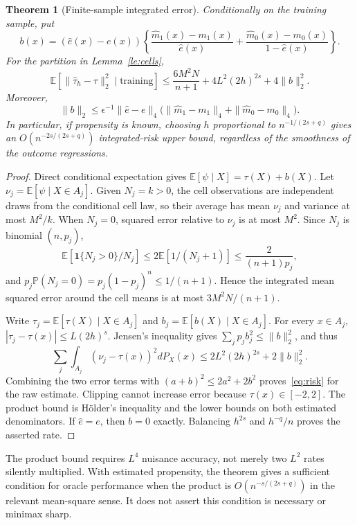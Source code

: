 \documentclass[11pt,a4paper]{article}
\newtheorem{theorem}{Theorem}[section]
\theoremstyle{definition}
\theoremstyle{remark}
\newcommand{\E}{\mathbb E}
\newcommand{\Prb}{\mathbb P}
\newcommand{\ind}{\mathbf 1}
\begin{document}
\begin{theorem}[Finite-sample integrated error]\label{th:risk}
Conditionally on the training sample, put
\[
 b(x)=(\widehat e(x)-e(x))\left\{
 \frac{\widehat m_1(x)-m_1(x)}{\widehat e(x)}+
 \frac{\widehat m_0(x)-m_0(x)}{1-\widehat e(x)}\right\}.
\]
For the partition in Lemma~\ref{le:cells},
\begin{equation}\label{eq:risk}
 \E[\|\widehat\tau_h-\tau\|_2^2\mid\text{training}]
 \leq\frac{6M^2N}{n+1}+4L^2(2h)^{2s}+4\|b\|_2^2.
\end{equation}
Moreover,
\[
 \|b\|_2\leq\epsilon^{-1}\|\widehat e-e\|_4
  \bigl(\|\widehat m_1-m_1\|_4+\|\widehat m_0-m_0\|_4\bigr).
\]
In particular, if propensity is known, choosing $h$ proportional to $n^{-1/(2s+q)}$ gives an $O(n^{-2s/(2s+q)})$ integrated-risk upper bound, regardless of the smoothness of the outcome regressions.
\end{theorem}
\begin{proof}
Direct conditional expectation gives $\E[\psi\mid X]=\tau(X)+b(X)$. Let $\nu_j=\E[\psi\mid X\in A_j]$. Given $N_j=k>0$, the cell observations are independent draws from the conditional cell law, so their average has mean $\nu_j$ and variance at most $M^2/k$. When $N_j=0$, squared error relative to $\nu_j$ is at most $M^2$. Since $N_j$ is binomial $(n,p_j)$,
\[
 \E[\ind\{N_j>0\}/N_j]\leq2\E[1/(N_j+1)]
 \leq\frac{2}{(n+1)p_j},
\]
and $p_j\Prb(N_j=0)=p_j(1-p_j)^n\leq1/(n+1)$. Hence the integrated mean squared error around the cell means is at most $3M^2N/(n+1)$.

Write $\tau_j=\E[\tau(X)\mid X\in A_j]$ and $b_j=\E[b(X)\mid X\in A_j]$. For every $x\in A_j$, $|\tau_j-\tau(x)|\leq L(2h)^s$. Jensen's inequality gives $\sum_jp_jb_j^2\leq\|b\|_2^2$, and thus
\[
 \sum_j\int_{A_j}(\nu_j-\tau(x))^2dP_X(x)
 \leq2L^2(2h)^{2s}+2\|b\|_2^2.
\]
Combining the two error terms with $(a+b)^2\leq2a^2+2b^2$ proves~\eqref{eq:risk} for the raw estimate. Clipping cannot increase error because $\tau(x)\in[-2,2]$. The product bound is H\"older's inequality and the lower bounds on both estimated denominators. If $\widehat e=e$, then $b=0$ exactly. Balancing $h^{2s}$ and $h^{-q}/n$ proves the asserted rate.
\end{proof}

The product bound requires $L^4$ nuisance accuracy, not merely two $L^2$ rates silently multiplied. With estimated propensity, the theorem gives a sufficient condition for oracle performance when the product is $O(n^{-s/(2s+q)})$ in the relevant mean-square sense. It does not assert this condition is necessary or minimax sharp.
\end{document}
